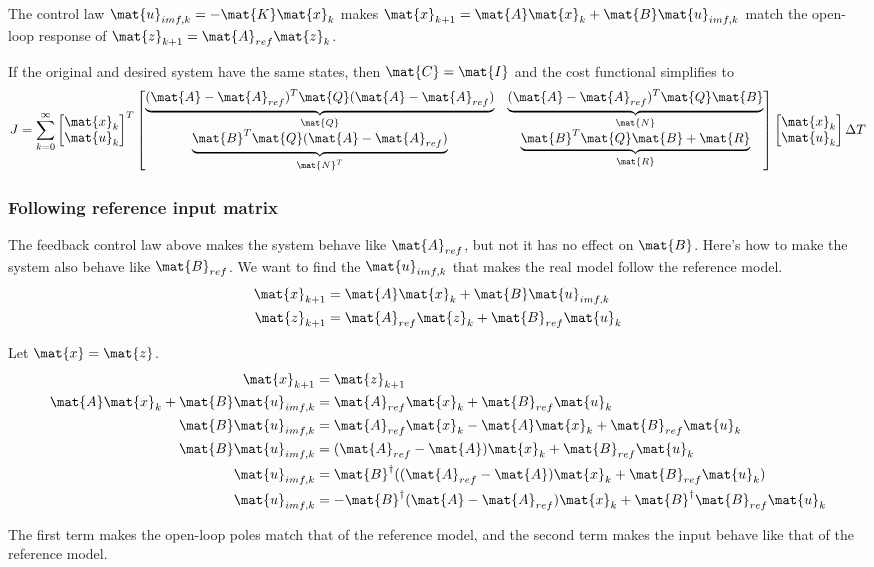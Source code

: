 The control law $\mat{u}_{imf,k} = -\mat{K}\mat{x}_k$ makes
$\mat{x}_{k+1} = \mat{A}\mat{x}_k + \mat{B}\mat{u}_{imf,k}$ match the open-loop
response of $\mat{z}_{k+1} = \mat{A}_{ref}\mat{z}_k$.

If the original and desired system have the same states, then
$\mat{C} = \mat{I}$ and the cost functional simplifies to
\begin{equation}
  J = \sum_{k=0}^\infty
  \begin{bmatrix}
    \mat{x}_k \\
    \mat{u}_k
  \end{bmatrix}^T
  \begin{bmatrix}
    \underbrace{(\mat{A} - \mat{A}_{ref})^T\mat{Q}
      (\mat{A} - \mat{A}_{ref})}_{\mat{Q}} &
    \underbrace{(\mat{A} - \mat{A}_{ref})^T\mat{Q}\mat{B}}_{\mat{N}} \\
    \underbrace{\mat{B}^T\mat{Q}(\mat{A} - \mat{A}_{ref})}_{\mat{N}^T} &
    \underbrace{\mat{B}^T\mat{Q}\mat{B} + \mat{R}}_{\mat{R}}
  \end{bmatrix}
  \begin{bmatrix}
    \mat{x}_k \\
    \mat{u}_k
  \end{bmatrix}
  \Delta T
\end{equation}

\subsubsection{Following reference input matrix}

The feedback control law above makes the system behave like $\mat{A}_{ref}$, but
not it has no effect on $\mat{B}$. Here's how to make the system also behave
like $\mat{B}_{ref}$. We want to find the $\mat{u}_{imf,k}$ that makes the real
model follow the reference model.
\begin{align*}
  \mat{x}_{k+1} &= \mat{A}\mat{x}_k + \mat{B}\mat{u}_{imf,k} \\
  \mat{z}_{k+1} &= \mat{A}_{ref}\mat{z}_k + \mat{B}_{ref}\mat{u}_k
\end{align*}

Let $\mat{x} = \mat{z}$.
\begin{align*}
  \mat{x}_{k+1} &= \mat{z}_{k+1} \\
  \mat{A}\mat{x}_k + \mat{B}\mat{u}_{imf,k} &= \mat{A}_{ref}\mat{x}_k +
    \mat{B}_{ref}\mat{u}_k \\
  \mat{B}\mat{u}_{imf,k} &= \mat{A}_{ref}\mat{x}_k - \mat{A}\mat{x}_k +
    \mat{B}_{ref}\mat{u}_k \\
  \mat{B}\mat{u}_{imf,k} &= (\mat{A}_{ref} - \mat{A})\mat{x}_k +
    \mat{B}_{ref}\mat{u}_k \\
  \mat{u}_{imf,k} &= \mat{B}^\dagger ((\mat{A}_{ref} - \mat{A})\mat{x}_k +
    \mat{B}_{ref}\mat{u}_k) \\
  \mat{u}_{imf,k} &= -\mat{B}^\dagger (\mat{A} - \mat{A}_{ref})\mat{x}_k +
    \mat{B}^\dagger \mat{B}_{ref}\mat{u}_k
\end{align*}

The first term makes the open-loop poles match that of the reference model, and
the second term makes the input behave like that of the reference model.
